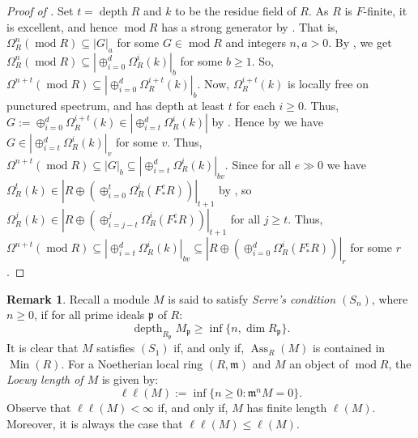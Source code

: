 \documentclass[11pt]{amsart}
\theoremstyle{plain}
\theoremstyle{definition}
\newtheorem{remark}[theorem]{Remark}
\numberwithin{equation}{section}
\numberwithin{theorem}{section}
\begin{document}
\begin{proof}[Proof of ] Set $t=\operatorname{depth } R$ and $k$ to be the residue field of $R$.
As $R$ is $F$-finite, it is excellent, and hence $\operatorname{mod} R$ has a strong generator by . That is, $\Omega_R^n(\operatorname{mod} R) \subseteq |G|_a$  for some $G\in \operatorname{mod} R$ and integers $n,a>0$. By \cite[Theorem 3.2]{BHST:2016}, we get $\Omega_R^n(\operatorname{mod} R)\subseteq|\oplus_{i=0}^d\Omega^i_R (k)|_b$ for some $b\geq 1$. So, $\Omega^{n+t}(\operatorname{mod} R)\subseteq|\oplus_{i=0}^d\Omega^{i+t}_R (k)|_b$. Now, $\Omega_R^{i+t}(k)$ is locally free on punctured spectrum, and has depth at least $t$ for each $i\geq 0$. Thus, $G:=\oplus_{i=0}^d\Omega^{i+t}_R (k) \in |\oplus_{i=t}^d \Omega_R^i(k)|$ by \cite[Theorem 4.1]{BHST:2016}. Hence by \cite[Remark 2.11]{BHST:2016} we have $G\in |\oplus_{i=t}^d \Omega_R^i(k)|_v$ for some $v$. Thus, $\Omega^{n+t}(\operatorname{mod} R)\subseteq|G|_b\subseteq |\oplus_{i=t}^d \Omega_R^i(k)|_{bv}$. Since for all $e\gg 0$ we have $\Omega^t_R (k) \in |R \oplus (\oplus_{i=0}^t \Omega^i_R (F^e_\ast R))|_{t+1}$ by , so $\Omega_R^j(k)\in |R \oplus (\oplus_{i=j-t}^j \Omega^i_R (F^e_\ast R))|_{t+1}$ for all $j\geq t$. Thus, $\Omega^{n+t}(\operatorname{mod} R)\subseteq |\oplus_{i=t}^d \Omega_R^i(k)|_{bv}\subseteq |R\oplus(\oplus_{i=0}^d \Omega^i_R(F^e_\ast R))|_{r}$ for some $r$.  
\end{proof}

\begin{remark}
     Recall a module $M$ is said to satisfy \textit{Serre's condition $(S_n)$}, where $n\geq 0$, if for all prime ideals $\mathfrak{p}$ of $R$:
    \begin{displaymath}
        \operatorname{depth}_{R_{\mathfrak{p}}} M_{\mathfrak{p}} \geq \inf\{n,\dim R_{\mathfrak{p}}\}.
    \end{displaymath}
    It is clear that $M$ satisfies $(S_1)$ if, and only if, $\operatorname{Ass}_R(M)$ is contained in $\operatorname{Min}(R)$. For a Noetherian local ring $(R,\mathfrak{m})$ and $M$ an object of $\operatorname{mod} R$, the \textit{Loewy length of $M$} is given by:
    \begin{displaymath}
        \ell\ell(M):=\inf\{n\geq 0: \mathfrak{m}^n M=0\}.    
    \end{displaymath}
    Observe that $\ell\ell(M)<\infty$ if, and only if, $M$ has finite length $\ell(M)$. Moreover, it is always the case that $\ell\ell(M)\leq\ell(M)$. 
\end{remark}
\end{document}
